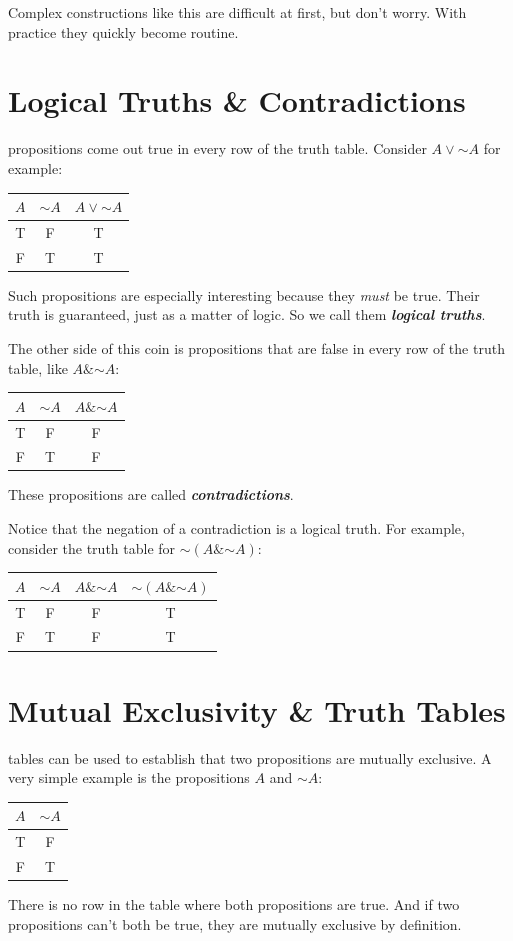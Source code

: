 \documentclass[justified]{tufte-book}
\renewcommand{\neg}{\mathbin{\sim}}
\renewcommand{\wedge}{\mathbin{\&}}
\theoremstyle{definition}
\theoremstyle{definition}
\theoremstyle{definition}
\theoremstyle{remark}
\begin{document}
Complex constructions like this are difficult at first, but don't worry. With practice they quickly become routine.

\hypertarget{logical-truths-contradictions}{%
\section{Logical Truths \& Contradictions}\label{logical-truths-contradictions}}

 propositions come out true in every row of the truth table. Consider \(A \vee \neg A\) for example:
\begin{longtable}[]{@{}ccc@{}}
\toprule
\(A\) & \(\neg A\) & \(A \vee \neg A\)\tabularnewline
\midrule
\endhead
T & F & T\tabularnewline
F & T & T\tabularnewline
\bottomrule
\end{longtable}
\noindent Such propositions are especially interesting because they \emph{must} be true. Their truth is guaranteed, just as a matter of logic. So we call them \textbf{\emph{logical truths}}.

The other side of this coin is propositions that are false in every row of the truth table, like \(A \wedge \neg A\):
\begin{longtable}[]{@{}ccc@{}}
\toprule
\(A\) & \(\neg A\) & \(A \wedge \neg A\)\tabularnewline
\midrule
\endhead
T & F & F\tabularnewline
F & T & F\tabularnewline
\bottomrule
\end{longtable}
\noindent These propositions are called \textbf{\emph{contradictions}}.

Notice that the negation of a contradiction is a logical truth. For example, consider the truth table for \(\neg (A \wedge \neg A)\):
\begin{longtable}[]{@{}cccc@{}}
\toprule
\(A\) & \(\neg A\) & \(A \wedge \neg A\) & \(\neg (A \wedge \neg A)\)\tabularnewline
\midrule
\endhead
T & F & F & T\tabularnewline
F & T & F & T\tabularnewline
\bottomrule
\end{longtable}

\hypertarget{mutual-exclusivity-truth-tables}{%
\section{Mutual Exclusivity \& Truth Tables}\label{mutual-exclusivity-truth-tables}}

 tables can be used to establish that two propositions are mutually exclusive. A very simple example is the propositions \(A\) and \(\neg A\):
\begin{longtable}[]{@{}cc@{}}
\toprule
\(A\) & \(\neg A\)\tabularnewline
\midrule
\endhead
T & F\tabularnewline
F & T\tabularnewline
\bottomrule
\end{longtable}
\noindent There is no row in the table where both propositions are true. And if two propositions can't both be true, they are mutually exclusive by definition.
\end{document}
